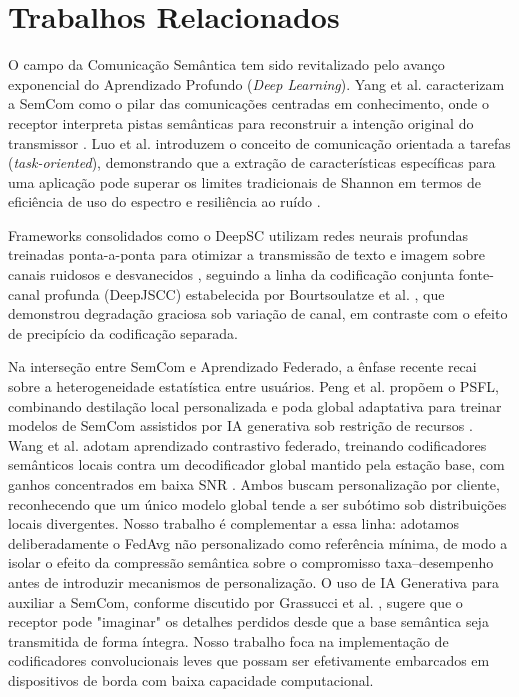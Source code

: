 \documentclass[conference,twocolumn]{IEEEtran}
\begin{document}
\section{Trabalhos Relacionados}

O campo da Comunicação Semântica tem sido revitalizado pelo avanço exponencial do Aprendizado Profundo (\textit{Deep Learning}). Yang et al. caracterizam a SemCom como o pilar das comunicações centradas em conhecimento, onde o receptor interpreta pistas semânticas para reconstruir a intenção original do transmissor \cite{yang2022semantic}. Luo et al. introduzem o conceito de comunicação orientada a tarefas (\textit{task-oriented}), demonstrando que a extração de características específicas para uma aplicação pode superar os limites tradicionais de Shannon em termos de eficiência de uso do espectro e resiliência ao ruído \cite{luo2022semantic}.

Frameworks consolidados como o DeepSC utilizam redes neurais profundas treinadas ponta-a-ponta para otimizar a transmissão de texto e imagem sobre canais ruidosos e desvanecidos \cite{xie2021deep}, seguindo a linha da codificação conjunta fonte-canal profunda (DeepJSCC) estabelecida por Bourtsoulatze et al. \cite{bourtsoulatze2019deep}, que demonstrou degradação graciosa sob variação de canal, em contraste com o efeito de precipício da codificação separada.

Na interseção entre SemCom e Aprendizado Federado, a ênfase recente recai sobre a heterogeneidade estatística entre usuários. Peng et al. propõem o PSFL, combinando destilação local personalizada e poda global adaptativa para treinar modelos de SemCom assistidos por IA generativa sob restrição de recursos \cite{peng2024psfl}. Wang et al. adotam aprendizado contrastivo federado, treinando codificadores semânticos locais contra um decodificador global mantido pela estação base, com ganhos concentrados em baixa SNR \cite{wang2024fedcl}. Ambos buscam personalização por cliente, reconhecendo que um único modelo global tende a ser subótimo sob distribuições locais divergentes. Nosso trabalho é complementar a essa linha: adotamos deliberadamente o FedAvg não personalizado como referência mínima, de modo a isolar o efeito da compressão semântica sobre o compromisso taxa--desempenho antes de introduzir mecanismos de personalização. O uso de IA Generativa para auxiliar a SemCom, conforme discutido por Grassucci et al. \cite{grassucci2023genai_meets_semcom}, sugere que o receptor pode "imaginar" os detalhes perdidos desde que a base semântica seja transmitida de forma íntegra. Nosso trabalho foca na implementação de codificadores convolucionais leves que possam ser efetivamente embarcados em dispositivos de borda com baixa capacidade computacional.
\end{document}
